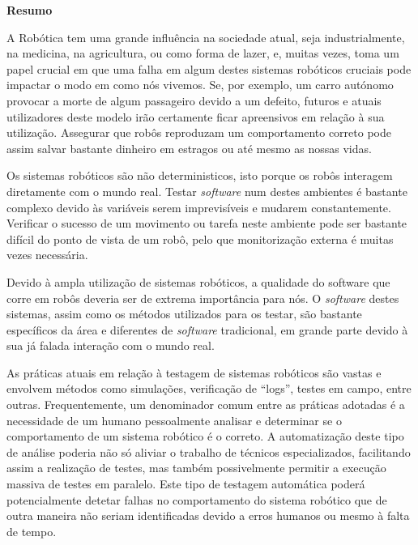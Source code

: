 
\vspace*{2cm}
\begin{center} \Large \bf Resumo
\end{center}
\vspace*{1cm} \setlength{\baselineskip}{0.6cm}

A Robótica tem uma grande influência na sociedade atual, seja industrialmente, na medicina, na agricultura, ou como forma de lazer, e, muitas vezes, toma um papel crucial em que uma falha em algum destes sistemas robóticos cruciais pode impactar o modo em como nós vivemos. Se, por exemplo, um carro autónomo provocar a morte de algum passageiro devido a um defeito, futuros e atuais utilizadores deste modelo irão certamente ficar apreensivos em relação à sua utilização. Assegurar que robôs reproduzam um comportamento correto pode assim salvar bastante dinheiro em estragos ou até mesmo as nossas vidas.

Os sistemas robóticos são não deterministicos, isto porque os robôs interagem diretamente com o mundo real. Testar \textit{software} num destes ambientes é bastante complexo devido às variáveis serem imprevisíveis e mudarem constantemente. Verificar o sucesso de um movimento ou tarefa neste ambiente pode ser bastante difícil do ponto de vista de um robô, pelo que monitorização externa é muitas vezes necessária. 

Devido à ampla utilização de sistemas robóticos, a qualidade do software que corre em robôs deveria ser de extrema importância para nós. O \textit{software} destes sistemas, assim como os métodos utilizados para os testar, são bastante específicos da área e diferentes de \textit{software} tradicional, em grande parte devido à sua já falada interação com o mundo real.

As práticas atuais em relação à testagem de sistemas robóticos são vastas e envolvem métodos como simulações, verificação de “logs”, testes em campo, entre outras. Frequentemente, um denominador comum entre as práticas adotadas é a necessidade de um humano pessoalmente analisar e determinar se o comportamento de um sistema robótico é o correto. A automatização deste tipo de análise poderia não só aliviar o trabalho de técnicos especializados, facilitando assim a realização de testes, mas também possivelmente permitir a execução massiva de testes em paralelo. Este tipo de testagem automática poderá potencialmente detetar falhas no comportamento do sistema robótico que de outra maneira não seriam identificadas devido a erros humanos ou mesmo à falta de tempo.

